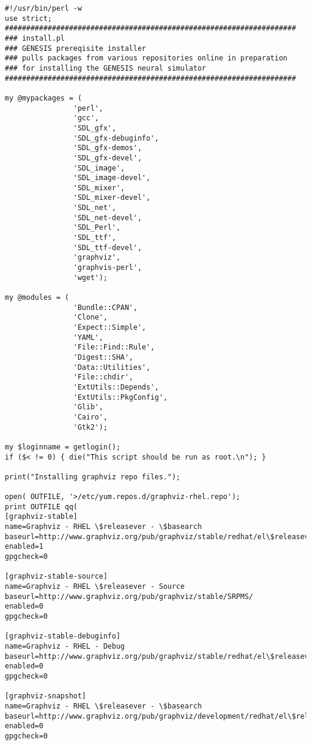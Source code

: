\documentclass[12pt]{article}
\begin{document}
\begin{verbatim}
#!/usr/bin/perl -w
use strict;
####################################################################
### install.pl
### GENESIS prereqisite installer
### pulls packages from various repositories online in preparation
### for installing the GENESIS neural simulator
####################################################################

my @mypackages = (
                'perl',
                'gcc',
                'SDL_gfx',
                'SDL_gfx-debuginfo',
                'SDL_gfx-demos',
                'SDL_gfx-devel',
                'SDL_image',
                'SDL_image-devel',
                'SDL_mixer',
                'SDL_mixer-devel',
                'SDL_net',
                'SDL_net-devel',
                'SDL_Perl',
                'SDL_ttf',
                'SDL_ttf-devel',
                'graphviz',
                'graphvis-perl',
                'wget');

my @modules = ( 
                'Bundle::CPAN',
                'Clone',
                'Expect::Simple',
                'YAML',
                'File::Find::Rule',
                'Digest::SHA',
                'Data::Utilities',
                'File::chdir',
                'ExtUtils::Depends',
                'ExtUtils::PkgConfig',
                'Glib',
                'Cairo',
                'Gtk2');

my $loginname = getlogin();
if ($< != 0) { die("This script should be run as root.\n"); }

print("Installing graphviz repo files.");

open( OUTFILE, '>/etc/yum.repos.d/graphviz-rhel.repo');
print OUTFILE qq(
[graphviz-stable]
name=Graphviz - RHEL \$releasever - \$basearch
baseurl=http://www.graphviz.org/pub/graphviz/stable/redhat/el\$releasever/\$basearch/os/
enabled=1
gpgcheck=0

[graphviz-stable-source]
name=Graphviz - RHEL \$releasever - Source
baseurl=http://www.graphviz.org/pub/graphviz/stable/SRPMS/
enabled=0
gpgcheck=0

[graphviz-stable-debuginfo]
name=Graphviz - RHEL - Debug
baseurl=http://www.graphviz.org/pub/graphviz/stable/redhat/el\$releasever/\$basearch/debug/
enabled=0
gpgcheck=0

[graphviz-snapshot]
name=Graphviz - RHEL \$releasever - \$basearch
baseurl=http://www.graphviz.org/pub/graphviz/development/redhat/el\$releasever/\$basearch/os/
enabled=0
gpgcheck=0


\end{verbatim}
\end{document}
